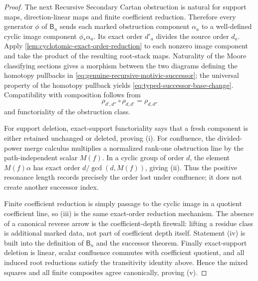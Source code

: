 \documentclass[11pt]{article}
\theoremstyle{remark}
\begin{document}
\begin{proof}
The next Recursive Secondary Cartan obstruction is natural for support maps,
direction-linear maps and finite coefficient reduction.  Therefore every generator
$\phi$ of $\mathsf B_n$ sends each marked obstruction component $\alpha_a$ to a
well-defined cyclic image component $\phi_*\alpha_a$.  Its exact order $d'_a$ divides
the source order $d_a$.  Apply \cref{lem:cyclotomic-exact-order-reduction} to each
nonzero image component and take the product of the resulting root-stack maps.  Naturality
of the Moore classifying sections gives a morphism between the two diagrams defining the
homotopy pullbacks in \eqref{eq:genuine-recursive-motivic-successor}; the universal
property of the homotopy pullback yields \eqref{eq:typed-successor-base-change}.
Compatibility with composition follows from
\[
 \rho_{d',d''}\circ\rho_{d,d'}=\rho_{d,d''}
\]
and functoriality of the obstruction class.

For support deletion, exact-support functoriality says that a fresh component is either
retained unchanged or deleted, proving (i).  For confluence, the divided-power merge
calculus multiplies a normalized rank-one obstruction line by the path-independent scalar
$M(f)$.  In a cyclic group of order $d$, the element $M(f)\alpha$ has exact order
$d/\gcd(d,M(f))$, giving (ii).  Thus the positive resonance length records precisely
the order lost under confluence; it does not create another successor index.

Finite coefficient reduction is simply passage to the cyclic image in a quotient
coefficient line, so (iii) is the same exact-order reduction mechanism.  The absence of
a canonical reverse arrow is the coefficient-depth firewall: lifting a residue class is
additional marked data, not part of coefficient depth itself.  Statement (iv) is built
into the definition of $\mathsf B_n$ and the successor theorem.  Finally exact-support
deletion is linear, scalar confluence commutes with coefficient quotient, and all induced
root reductions satisfy the transitivity identity above.  Hence the mixed squares and
all finite composites agree canonically, proving (v).
\end{proof}
\end{document}
